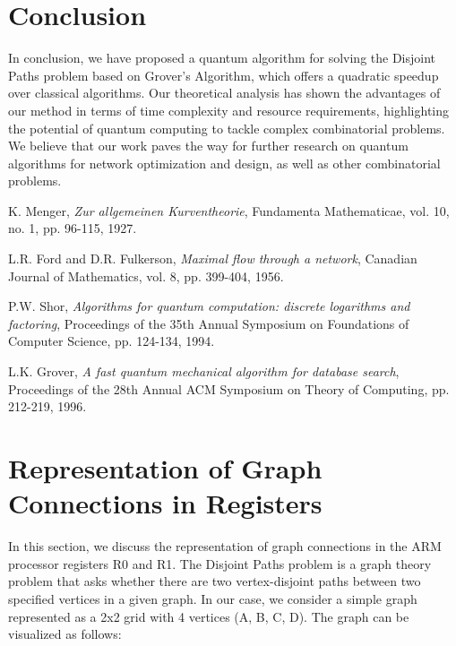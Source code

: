 
\section{Conclusion}
\label{sec:conclusion}
In conclusion, we have proposed a quantum algorithm for solving the Disjoint Paths problem based on Grover's Algorithm, which offers a quadratic speedup over classical algorithms. Our theoretical analysis has shown the advantages of our method in terms of time complexity and resource requirements, highlighting the potential of quantum computing to tackle complex combinatorial problems. We believe that our work paves the way for further research on quantum algorithms for network optimization and design, as well as other combinatorial problems.

\begin{thebibliography}{9}

K. Menger,
\emph{Zur allgemeinen Kurventheorie},
Fundamenta Mathematicae, vol. 10, no. 1, pp. 96-115, 1927.

L.R. Ford and D.R. Fulkerson,
\emph{Maximal flow through a network},
Canadian Journal of Mathematics, vol. 8, pp. 399-404, 1956.

P.W. Shor,
\emph{Algorithms for quantum computation: discrete logarithms and factoring},
Proceedings of the 35th Annual Symposium on Foundations of Computer Science, pp. 124-134, 1994.

L.K. Grover,
\emph{A fast quantum mechanical algorithm for database search},
Proceedings of the 28th Annual ACM Symposium on Theory of Computing, pp. 212-219, 1996.

\end{thebibliography}

\section{Representation of Graph Connections in Registers}

In this section, we discuss the representation of graph connections in the ARM processor registers R0 and R1. The Disjoint Paths problem is a graph theory problem that asks whether there are two vertex-disjoint paths between two specified vertices in a given graph. In our case, we consider a simple graph represented as a 2x2 grid with 4 vertices (A, B, C, D). The graph can be visualized as follows:

